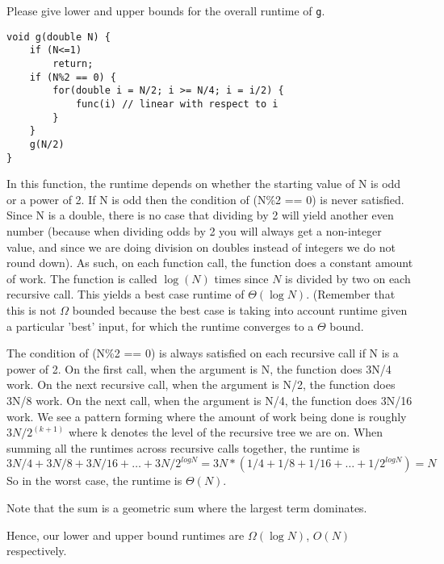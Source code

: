 \question Please give lower and upper bounds for the overall runtime of \lstinline$g$.

\begin{lstlisting}
void g(double N) {
    if (N<=1) 
    	return;
    if (N%2 == 0) {
    	for(double i = N/2; i >= N/4; i = i/2) {
    		func(i) // linear with respect to i
    	}
    }
    g(N/2)
}
\end{lstlisting}

\begin{solution}[1.5in]
In this function, the runtime depends on whether the starting value of N is odd or a power of 2. 
If N is odd then the condition of (N\%2 == 0) is never satisfied. Since N is a double, there is no case that dividing by 2 will yield another even number (because when dividing odds by 2 you will always get a non-integer value, and since we are doing division on doubles instead of integers we do not round down).
As such, on each function call, the function does a constant amount of work. The function is called $\log(N)$ times since $N$ is divided by two on each recursive call. This yields a best case runtime of $\Theta(\log N)$. (Remember that this is not $\Omega$ bounded because the best case is taking into account runtime given a particular 'best' input, for which the runtime converges to a $\Theta$ bound. 

The condition of (N\%2 == 0) is always satisfied on each recursive call if N is a power of 2. On the first call, when the argument is N, the function does 3N/4 work. On the next recursive call, when the argument is N/2, the function does 3N/8 work. On the next call, when the argument is N/4, the function does 3N/16 work. We see a pattern forming where the amount of work being done is roughly $3N/2^{(k+1)}$ where k denotes the level of the recursive tree we are on. When summing all the runtimes across recursive calls together, the runtime is 
$$3N/4 + 3N/8 + 3N/16 + … + 3N/2^{logN} = 3N * (1/4 + 1/8 + 1/16 + … + 1/2^{logN}) = N $$
So in the worst case, the runtime is $\Theta(N)$. 

Note that the sum is a geometric sum where the largest term dominates.

Hence, our lower and upper bound runtimes are $\Omega(\log N)$, $O(N)$ respectively.

\end{solution}
